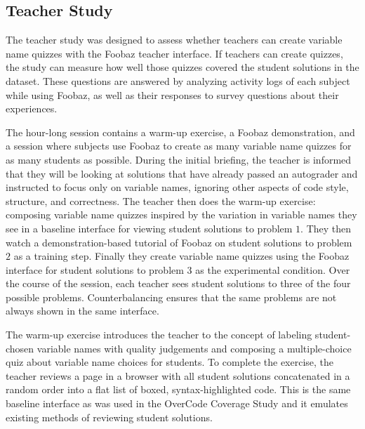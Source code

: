 \subsection{Teacher Study}

The teacher study was designed to assess whether teachers can create variable name quizzes with the Foobaz teacher interface. If teachers can create quizzes, the study can measure how well those quizzes covered the student solutions in the dataset. These questions are answered by analyzing activity logs of each subject while using Foobaz, as well as their responses to survey questions about their experiences.

The hour-long session contains a warm-up exercise, a Foobaz demonstration, and a session where subjects use Foobaz to create as many variable name quizzes for as many students as possible. During the initial briefing, the teacher is informed that they will be looking at solutions that have already passed an autograder and instructed to focus only on variable names, ignoring other aspects of code style, structure, and correctness. The teacher then does the warm-up exercise: composing variable name quizzes inspired by the variation in variable names they see in a baseline interface for viewing student solutions to problem $1$. They then watch a demonstration-based tutorial of Foobaz on student solutions to problem $2$ as a training step. Finally they create variable name quizzes using the Foobaz interface for student solutions to problem $3$ as the experimental condition. Over the course of the session, each teacher sees student solutions to three of the four possible problems. Counterbalancing ensures that the same problems are not always shown in the same interface. 


The warm-up exercise introduces the teacher to the concept of labeling student-chosen variable names with quality judgements and composing a multiple-choice quiz about variable name choices for students. %
To complete the exercise, the teacher reviews a page in a browser with all student solutions concatenated in a random order into a flat list of boxed, syntax-highlighted code. This is the same baseline interface as was used in the OverCode Coverage Study and it emulates existing methods of reviewing student solutions. 

